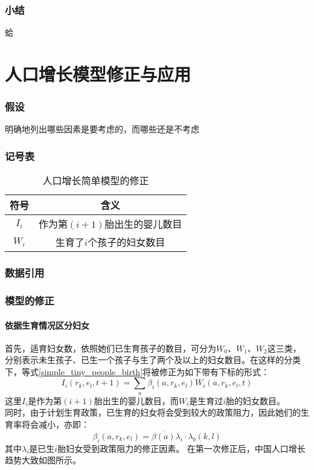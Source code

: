 \documentclass[11pt]{article}
\begin{document}
\section{小结}
	蛤
	
\part{人口增长模型修正与应用}
\section{假设}
	明确地列出哪些因素是要考虑的，而哪些还是不考虑
\section{记号表}
	\begin{table}[]
		\centering
		\caption{人口增长简单模型的修正}
		\label{amend_symbol}
		\begin{tabular}{cc}
			\hline
			符号		&	含义					\\
			\hline
			$I_i$		&	作为第$(i+1)$胎出生的婴儿数目	\\
			$W_i$		&	生育了$i$个孩子的妇女数目			\\
			\hline
		\end{tabular}
	\end{table}
\section{数据引用}
\section{模型的修正}
\subsection{依据生育情况区分妇女}
首先，适育妇女数，依照她们已生育孩子的数目，可分为$W_0$、$W_1$、$W_2$这三类，分别表示未生孩子、已生一个孩子与生了两个及以上的妇女数目。在这样的分类下，等式\ref{simple_tiny_people_birth}将被修正为如下带有下标的形式：
	\begin{equation}
		\label{amend_tiny_people_birth}
		I_i(r_k, e_l, t+1) = \sum_a \beta_i(a, r_k, e_l)W_i(a, r_k, e_l, t)
	\end{equation}
这里$I_i$是作为第$(i+1)$胎出生的婴儿数目，而$W_i$是生育过$i$胎的妇女数目。\\
\indent
同时，由于计划生育政策，已生育的妇女将会受到较大的政策阻力，因此她们的生育率将会减小，亦即：
	\begin{equation}
		\label{amend_birthrate}
		\beta_i(a, r_k, e_l) = \overline{\beta(a)} \lambda_i \cdot \lambda_b(k,l)
	\end{equation}
其中$\lambda_i$是已生$i$胎妇女受到政策阻力的修正因素。
\indent
在第一次修正后，中国人口增长趋势大致如图所示。
\end{document}
